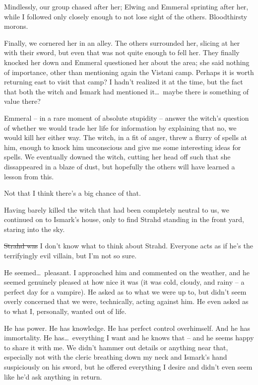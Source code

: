 Mindlessly, our group chased after her; Elwing and Emmeral sprinting after her, while I followed only closely enough to not lose sight of the others. Bloodthirsty morons.

Finally, we cornered her in an alley. The others surrounded her, slicing at her with their sword, but even that was not quite enough to fell her. They finally knocked her down and Emmeral questioned her about the area; she said nothing of importance, other than mentioning again the Vistani camp. Perhaps it is worth returning east to visit that camp? I hadn't realized it at the time, but the fact that both the witch and Ismark had mentioned it\dots\ maybe there is something of value there?

Emmeral -- in a rare moment of absolute stupidity -- answer the witch's question of whether we would trade her life for information by explaining that no, we would kill her either way. The witch, in a fit of anger, threw a flurry of spells at him, enough to knock him unconscious and give me some interesting ideas for spells. We eventually downed the witch, cutting her head off such that she dissappeared in a blaze of dust, but hopefully the others will have learned a lesson from this.

Not that I think there's a big chance of that.

Having barely killed the witch that had been completely neutral to us, we continued on to Ismark's house, only to find Strahd standing in the front yard, staring into the sky.

\st{Strahd was} I don't know what to think about Strahd. Everyone acts as if he's the terrifyingly evil villain, but I'm not so sure.

He seemed\dots\ pleasant. I approached him and commented on the weather, and he seemed genuinely pleased at how nice it was (it was cold, cloudy, and rainy -- a perfect day for a vampire). He asked as to what we were up to, but didn't seem overly concerned that we were, technically, acting against him. He even asked as to what I, personally, wanted out of life.

He has power. He has knowledge. He has perfect control overhimself. And he has immortality. He has\dots\ everything I want and he knows that -- and he seems happy to share it with me. We didn't hammer out details or anything near that, especially not with the cleric breathing down my neck and Ismark's hand suspiciously on his sword, but he offered everything I desire and didn't even seem like he'd ask anything in return.

